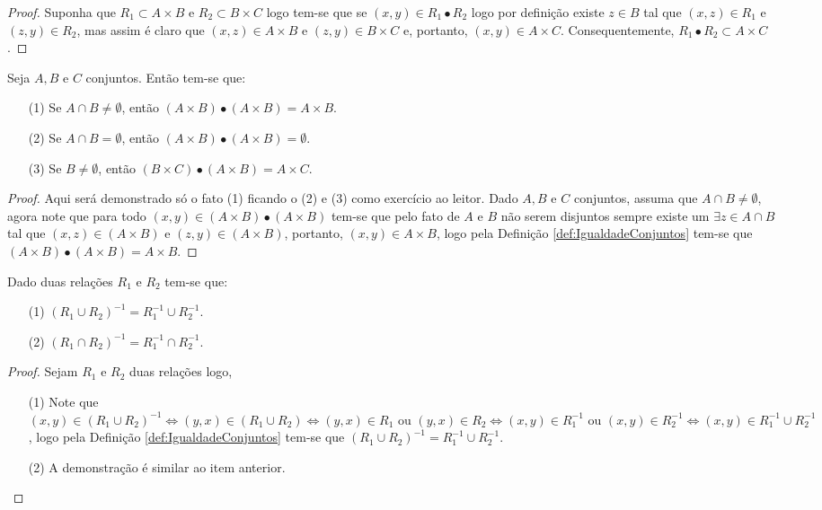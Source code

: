 \begin{proof}
	 Suponha que $R_1 \subset A \times B$ e $R_2 \subset B \times C$ logo tem-se que se $(x, y) \in R_1 \bullet R_2$ logo por definição existe $z \in B$ tal que $(x, z) \in R_1$ e $(z, y) \in R_2$, mas assim é claro que $(x, z) \in A \times B$ e $(z, y) \in B \times C$ e, portanto, $(x, y) \in A \times C$. Consequentemente, $R_1 \bullet R_2 \subset A \times C$.
\end{proof}

\begin{theorem}
	Seja $A, B$ e $C$ conjuntos. Então tem-se que:
	\begin{itemize}
		\item[(1)] Se $A \cap B \neq \emptyset$, então $(A \times B) \bullet (A \times B) = A \times B$.
		\item[(2)] Se $A \cap B = \emptyset$, então $(A \times B) \bullet (A \times B) = \emptyset$.
		\item[(3)] Se $B \neq \emptyset$, então $(B \times C) \bullet (A \times B) = A \times C$.
	\end{itemize}
\end{theorem}

\begin{proof}
	Aqui será demonstrado só o fato (1) ficando o (2) e (3) como exercício ao leitor. Dado $A, B$ e $C$ conjuntos, assuma que $A \cap B \neq \emptyset$, agora note que para todo $(x, y) \in (A \times B) \bullet (A \times B)$ tem-se que pelo fato de $A$ e $B$ não serem disjuntos sempre existe um $\exists z \in A \cap B$ tal que $(x, z) \in (A \times B)$ e $(z, y) \in (A \times B)$, portanto, $(x, y) \in A \times B$, logo pela Definição \ref{def:IgualdadeConjuntos} tem-se que $(A \times B) \bullet (A \times B) = A \times B$.
\end{proof}

\begin{theorem}\label{teo:DistributividadeDaRelacaoInversa}
	Dado duas relações $R_1$ e $R_2$ tem-se que:
	\begin{itemize}
		\item[(1)] $(R_1 \cup R_2)^{-1} = R_1^{-1} \cup R_2^{-1}$.
		\item[(2)] $(R_1 \cap R_2)^{-1} = R_1^{-1} \cap R_2^{-1}$.
	\end{itemize}
\end{theorem}

\begin{proof}
	Sejam $R_1$ e $R_2$ duas relações logo,
	\begin{itemize}
		\item[(1)] Note que $(x, y) \in (R_1 \cup R_2)^{-1} \Longleftrightarrow  (y, x) \in (R_1 \cup R_2) \Longleftrightarrow (y, x) \in R_1 \text{ ou } (y, x) \in R_2 \Longleftrightarrow (x, y) \in R_1^{-1} \text{ ou } (x, y) \in R_2^{-1} \Longleftrightarrow (x, y) \in R_1^{-1} \cup R_2^{-1}$, logo pela Definição \ref{def:IgualdadeConjuntos} tem-se que $(R_1 \cup R_2)^{-1} = R_1^{-1} \cup R_2^{-1}$.
		\item[(2)] A demonstração é similar ao item anterior.
	\end{itemize}
\end{proof}

